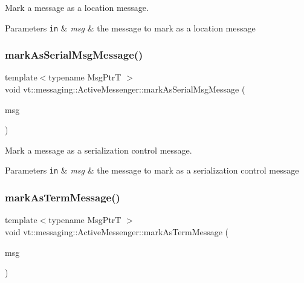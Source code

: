 Mark a message as a location message. 


\begin{DoxyParams}[1]{Parameters}
\mbox{\tt in}  & {\em msg} & the message to mark as a location message \\
\hline
\end{DoxyParams}
\mbox{\label{structvt_1_1messaging_1_1_active_messenger_ae4f8d48cda11b13d4447ab253ff18bf2}} 
\subsubsection{\texorpdfstring{mark\+As\+Serial\+Msg\+Message()}{markAsSerialMsgMessage()}}
{\footnotesize\ttfamily template$<$typename Msg\+PtrT $>$ \\
void vt\+::messaging\+::\+Active\+Messenger\+::mark\+As\+Serial\+Msg\+Message (\begin{DoxyParamCaption}\item[{Msg\+PtrT const}]{msg }\end{DoxyParamCaption})}



Mark a message as a serialization control message. 


\begin{DoxyParams}[1]{Parameters}
\mbox{\tt in}  & {\em msg} & the message to mark as a serialization control message \\
\hline
\end{DoxyParams}
\mbox{\label{structvt_1_1messaging_1_1_active_messenger_ad76f4f0ee9830f4431b57720163f715c}} 
\subsubsection{\texorpdfstring{mark\+As\+Term\+Message()}{markAsTermMessage()}}
{\footnotesize\ttfamily template$<$typename Msg\+PtrT $>$ \\
void vt\+::messaging\+::\+Active\+Messenger\+::mark\+As\+Term\+Message (\begin{DoxyParamCaption}\item[{Msg\+PtrT const}]{msg }\end{DoxyParamCaption})}



